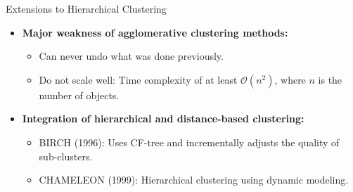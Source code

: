 \begin{frame}{Extensions to Hierarchical Clustering}
	\begin{itemize}
		\item \textbf{Major weakness of agglomerative clustering methods:}
		      \begin{itemize}
			      \item Can never undo what was done previously.
			      \item Do not scale well: Time complexity of at least
			            $\mathcal{O}(n^2)$, where $n$ is the number of objects.
		      \end{itemize}
		\item \textbf{Integration of hierarchical and distance-based
			      clustering:}
		      \begin{itemize}
			      \item BIRCH (1996): Uses CF-tree and incrementally adjusts the
			            quality of sub-clusters.
			      \item CHAMELEON (1999): Hierarchical clustering using dynamic
			            modeling.
		      \end{itemize}
	\end{itemize}
\end{frame}

